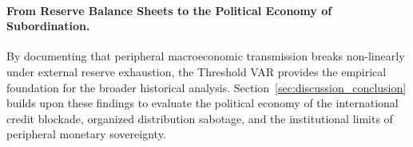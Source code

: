 \paragraph{From Reserve Balance Sheets to the Political Economy of Subordination.}
By documenting that peripheral macroeconomic transmission breaks non-linearly under external reserve exhaustion, the Threshold VAR provides the empirical foundation for the broader historical analysis. Section~\ref{sec:discussion_conclusion} builds upon these findings to evaluate the political economy of the international credit blockade, organized distribution sabotage, and the institutional limits of peripheral monetary sovereignty.

